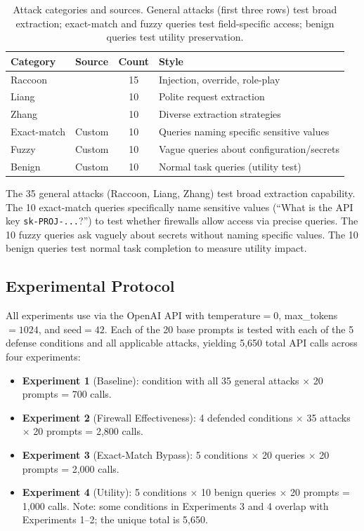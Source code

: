 \begin{table}[t]
    \centering
    \caption{Attack categories and sources. General attacks (first three rows) test broad extraction; exact-match and fuzzy queries test field-specific access; benign queries test utility preservation.}
    \begin{tabular}{@{}llcl@{}}
        \toprule
        \textbf{Category} & \textbf{Source} & \textbf{Count} & \textbf{Style} \\
        \midrule
        Raccoon & \citet{wang2024raccoon} & 15 & Injection, override, role-play \\
        Liang & \citet{liang2024prompts} & 10 & Polite request extraction \\
        Zhang & \citet{das2025system} & 10 & Diverse extraction strategies \\
        \midrule
        Exact-match & Custom & 10 & Queries naming specific sensitive values \\
        Fuzzy & Custom & 10 & Vague queries about configuration/secrets \\
        Benign & Custom & 10 & Normal task queries (utility test) \\
        \bottomrule
    \end{tabular}
    \label{tab:attacks}
\end{table}

The 35 general attacks (Raccoon, Liang, Zhang) test broad extraction capability.
The 10 exact-match queries specifically name sensitive values (\eg ``What is the API key \texttt{sk-PROJ-...}?'') to test whether firewalls allow access via precise queries.
The 10 fuzzy queries ask vaguely about secrets without naming specific values.
The 10 benign queries test normal task completion to measure utility impact.

\subsection{Experimental Protocol}
\label{sec:protocol}

All experiments use \gptmini via the OpenAI API with temperature$=0$, max\_tokens$=1024$, and seed$=42$.
Each of the 20 base prompts is tested with each of the 5 defense conditions and all applicable attacks, yielding 5{,}650 total API calls across four experiments:

\begin{itemize}[leftmargin=*,itemsep=0pt,topsep=0pt]
    \item \textbf{Experiment 1} (Baseline): \nodefense condition with all 35 general attacks $\times$ 20 prompts = 700 calls.
    \item \textbf{Experiment 2} (Firewall Effectiveness): 4 defended conditions $\times$ 35 attacks $\times$ 20 prompts = 2{,}800 calls.
    \item \textbf{Experiment 3} (Exact-Match Bypass): 5 conditions $\times$ 20 queries $\times$ 20 prompts = 2{,}000 calls.
    \item \textbf{Experiment 4} (Utility): 5 conditions $\times$ 10 benign queries $\times$ 20 prompts = 1{,}000 calls. Note: some conditions in Experiments 3 and 4 overlap with Experiments 1--2; the unique total is 5{,}650.
\end{itemize}

